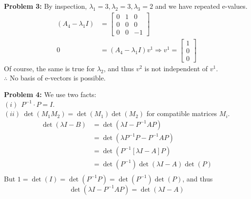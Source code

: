 \documentclass[letterpaper]{article}
\begin{document}


\bigskip

\noindent \textbf{Problem 3:}
By inspection, $\lambda_1 = 3, \lambda_2 = 3, \lambda_3 = 2$ and we have repeated e-values.
$$\begin{aligned}
(A_4 - \lambda_1 I)&=\left[ \begin{array}{ccc} 0 & 1 & 0 \\ 0 & 0 & 0 \\ 0& 0& -1 \end{array} \right] \\
0 &= (A_4 - \lambda_1 I) v^1 \Rightarrow v^1 = \begin{bmatrix} 1 \\ 0 \\ 0 \end{bmatrix} \end{aligned}$$
Of course, the same is true for $\lambda_2$, and thus $v^2$ is not independent of $v^1$.
\medskip \\
$\therefore$ No basis of e-vectors is possible.

\bigskip

\noindent \textbf{Problem 4:}
We use two facts: \medskip \\
$(i)~~ P^{-1} \cdot P = I $. \medskip \\
$(ii)~ \det(M_1 M_2 ) = \det(M_1)\det(M_2)$  for compatible matrices $M_i$.
$$\begin{aligned}\det(\lambda I-B) &= \det(\lambda I - P^{-1}AP) \\
                                    &= \det(\lambda P^{-1}P - P^{-1}AP) \\
                                    &= \det(P^{-1}[\lambda I - A]P) \\
                                    &= \det(P^{-1})\det(\lambda I - A)\det(P) \\
\end{aligned}$$
But $1=\det(I)=\det(P^{-1}P)=\det(P^{-1})\det(P)$, and thus                                    $$\det(\lambda I - P^{-1} AP) = \det(\lambda I -A)$$

\bigskip
\end{document}
